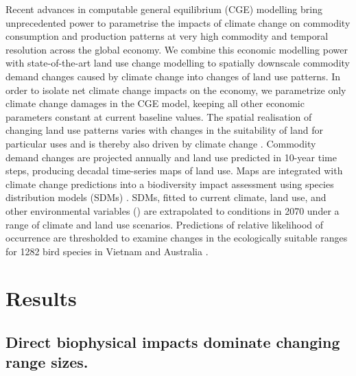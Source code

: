 \documentclass[titlesmallcaps,copyrightpage]{uomthesis}\usepackage[]{graphicx}\usepackage[]{color}
\begin{document}
Recent advances in computable general equilibrium (CGE) modelling \citep{van_ha_building_2017, van_ha_solving_2016} bring unprecedented power to parametrise the impacts of climate change on commodity consumption and production patterns at very high commodity and temporal resolution across the global economy. We combine this economic modelling power with state-of-the-art land use change modelling to spatially downscale commodity demand changes caused by climate change \citep{roson_estimation_2016} into changes of land use patterns. In order to isolate net climate change impacts on the economy, we parametrize only climate change damages in the CGE model, keeping all other economic parameters constant at current baseline values. The spatial realisation of changing land use patterns varies with changes in the suitability of land for particular uses and is thereby also driven by climate change \citep{verburg_combining_2009, fuchs_high-resolution_2013}. Commodity demand changes are projected annually and land use predicted in 10-year time steps, producing decadal time-series maps of land use. Maps are integrated with climate change predictions into a biodiversity impact assessment using species distribution models (SDMs) \citep{lawson_prevalence_2014, wintle_fauna_2005, wintle_ecologicaleconomic_2011, thomas_climate_2004}. SDMs, fitted to current climate, land use, and other environmental variables () are extrapolated to conditions in 2070 under a range of climate and land use scenarios. Predictions of relative likelihood of occurrence are thresholded to examine changes in the ecologically suitable ranges for 1282 bird species in Vietnam and Australia \citep{lawson_prevalence_2014, wintle_fauna_2005, wintle_ecologicaleconomic_2011, thomas_climate_2004}.

\section{Results}
\subsection{Direct biophysical impacts dominate changing range sizes.}
\end{document}
